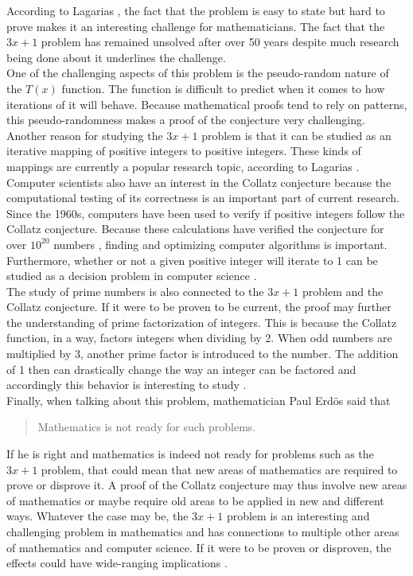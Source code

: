 \documentclass[12pt,a4paper,reqno]{amsart}
\begin{document}
According to Lagarias \cite{src:03}, the fact that the problem is easy to state 
but hard to prove makes it an interesting challenge for mathematicians.
The fact that the $3x+1$ problem has remained unsolved after over 50 years
despite much research being done about it underlines the challenge. \\
One of the challenging aspects of this problem is the pseudo-random nature of 
the $T(x)$ function. The function is difficult to predict when it comes to how 
iterations of it will behave. Because mathematical proofs tend to rely on 
patterns, this pseudo-randomness makes a proof of the conjecture very
challenging. \\
Another reason for studying the $3x+1$ problem is that it can be studied as an 
iterative mapping of positive integers to positive integers. These kinds of
mappings are currently a popular research topic, according to Lagarias
\cite{src:03}. \\
Computer scientists also have an interest in the Collatz conjecture because 
the computational testing of its correctness is an important part of 
current research. Since the 1960s, computers have been used to verify if
positive integers follow the Collatz conjecture.
Because these calculations have verified the conjecture for over $10^{20}$ 
numbers \cite{src:04}, finding and optimizing computer algorithms is important. 
Furthermore, whether or not a given positive integer will iterate to 1 can be 
studied as a decision problem in computer science \cite{src:04}. \\
The study of prime numbers is also connected to the $3x+1$ problem and the
Collatz conjecture. If it were to be proven to be current, the proof may
further the understanding of prime factorization of integers. This is because 
the Collatz function, in a way, factors integers when dividing by 2. When odd 
numbers are multiplied by 3, another prime factor is introduced to the number.
The addition of 1 then can drastically change the way an integer can be
factored and accordingly this behavior is interesting to study \cite{src:03}.\\
Finally, when talking about this problem, mathematician Paul Erdös said that
\begin{quote}
Mathematics is not ready for such problems.
\end{quote}
If he is right and mathematics is indeed not ready for problems such as the
$3x+1$ problem, that could mean that new areas of mathematics are required to
prove or disprove it. A proof of the Collatz conjecture may thus involve new 
areas of mathematics or maybe require old areas to be applied in new and
different ways. Whatever the case may be, the $3x+1$ problem is an interesting
and challenging problem in mathematics and has connections to multiple other
areas of mathematics and computer science. If it were to be proven or
disproven, the effects could have wide-ranging implications \cite{src:03}.
\end{document}
